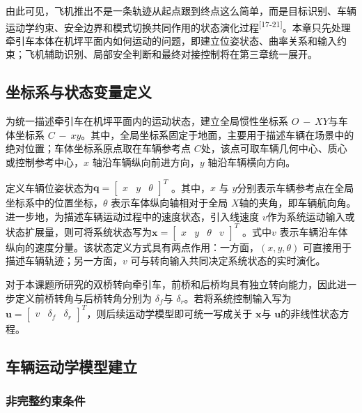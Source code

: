 \documentclass[UTF8,a4paper,12pt]{ctexart}
\begin{document}
由此可见，飞机推出不是一条轨迹从起点跟到终点这么简单，而是目标识别、车辆运动学约束、安全边界和模式切换共同作用的状态演化过程\textsuperscript{[17-21]}。本章只先处理牵引车本体在机坪平面内如何运动的问题，即建立位姿状态、曲率关系和输入约束；飞机辅助识别、局部安全判断和最终对接控制将在第三章统一展开。

\subsection{坐标系与状态变量定义}\label{_Toc229105296}

为统一描述牵引车在机坪平面内的运动状态，建立全局惯性坐标系 \(O\text{ } - \text{ }XY\)与车体坐标系 \(C\text{ } - \text{ }xy\)。其中，全局坐标系固定于地面，主要用于描述车辆在场景中的绝对位置；车体坐标系原点取在车辆参考点 \(C\)处，该点可取车辆几何中心、质心或控制参考中心，\(x\) 轴沿车辆纵向前进方向，\(y\) 轴沿车辆横向方向。

定义车辆位姿状态为\(\mathbf{q} = \begin{bmatrix}
x & y & \theta
\end{bmatrix}^{T}\) 。其中，\(x\) 与 \(y\)分别表示车辆参考点在全局坐标系中的位置坐标，\(\theta\) 表示车体纵向轴相对于全局 \(X\)轴的夹角，即车辆航向角。进一步地，为描述车辆运动过程中的速度状态，引入线速度 \(v\)作为系统运动输入或状态扩展量，则可将系统状态写为\(\mathbf{x} = \begin{bmatrix}
x & y & \theta & v
\end{bmatrix}^{T}\) 。式中\(v\) 表示车辆沿车体纵向的速度分量。该状态定义方式具有两点作用：一方面，\(\left( x,y,\theta \right)\) 可直接用于描述车辆轨迹；另一方面，\(v\) 可与转向输入共同决定系统状态的实时演化。

对于本课题所研究的双桥转向牵引车，前桥和后桥均具有独立转向能力，因此进一步定义前桥转角与后桥转角分别为 \(\delta_{f}\)与 \(\delta_{r}\)。若将系统控制输入写为\(\mathbf{u} = \begin{bmatrix}
v & \delta_{f} & \delta_{r}
\end{bmatrix}^{T}，\)则后续运动学模型即可统一写成关于 \(\mathbf{x}\)与 \(\mathbf{u}\)的非线性状态方程。

\subsection{车辆运动学模型建立}\label{_Toc229105297}

\subsubsection{非完整约束条件}\label{_Toc229105298}
\end{document}
